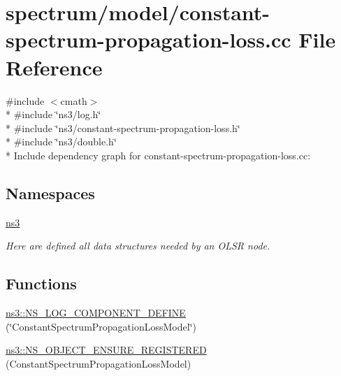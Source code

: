 \hypertarget{constant-spectrum-propagation-loss_8cc}{}\section{spectrum/model/constant-\/spectrum-\/propagation-\/loss.cc File Reference}
\label{constant-spectrum-propagation-loss_8cc}
{\ttfamily \#include $<$cmath$>$}\\*
{\ttfamily \#include \char`\"{}ns3/log.\+h\char`\"{}}\\*
{\ttfamily \#include \char`\"{}ns3/constant-\/spectrum-\/propagation-\/loss.\+h\char`\"{}}\\*
{\ttfamily \#include \char`\"{}ns3/double.\+h\char`\"{}}\\*
Include dependency graph for constant-\/spectrum-\/propagation-\/loss.cc\+:
\subsection*{Namespaces}
\begin{DoxyCompactItemize}
\item 
 \hyperlink{namespacens3}{ns3}
\begin{DoxyCompactList}\small\item\em Here are defined all data structures needed by an O\+L\+SR node. \end{DoxyCompactList}\end{DoxyCompactItemize}
\subsection*{Functions}
\begin{DoxyCompactItemize}
\item 
\hyperlink{namespacens3_a2badb46973b748e02d0662977081c35c}{ns3\+::\+N\+S\+\_\+\+L\+O\+G\+\_\+\+C\+O\+M\+P\+O\+N\+E\+N\+T\+\_\+\+D\+E\+F\+I\+NE} (\char`\"{}Constant\+Spectrum\+Propagation\+Loss\+Model\char`\"{})
\item 
\hyperlink{namespacens3_ac406c64756764eb52ef56d327b9ca37a}{ns3\+::\+N\+S\+\_\+\+O\+B\+J\+E\+C\+T\+\_\+\+E\+N\+S\+U\+R\+E\+\_\+\+R\+E\+G\+I\+S\+T\+E\+R\+ED} (Constant\+Spectrum\+Propagation\+Loss\+Model)
\end{DoxyCompactItemize}
